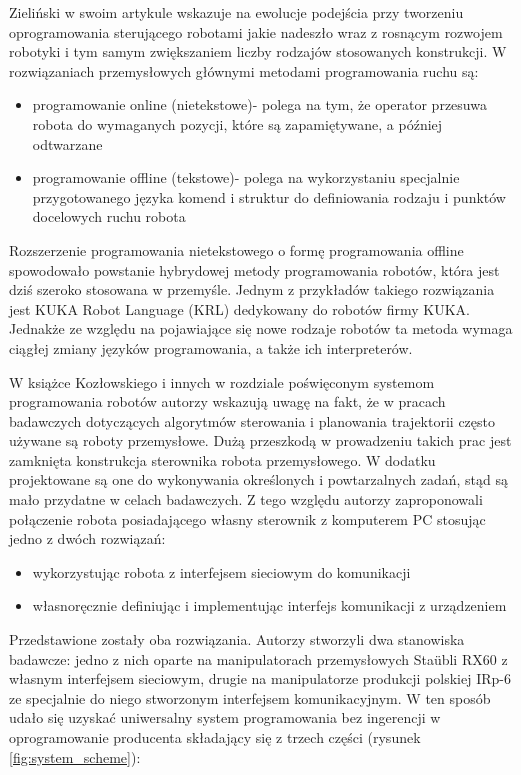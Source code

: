 \documentclass[a4paper, 12pt, twoside]{article}
\begin{document}
Zieliński w swoim artykule \cite{ramowezielinski} wskazuje na ewolucje podejścia przy tworzeniu oprogramowania sterującego robotami jakie nadeszło wraz z rosnącym rozwojem robotyki i tym samym zwiększaniem liczby rodzajów stosowanych konstrukcji. W rozwiązaniach przemysłowych głównymi metodami programowania ruchu są:

\begin{itemize}
\item programowanie online (nietekstowe)- polega na tym, że operator przesuwa robota do wymaganych pozycji, które są zapamiętywane, a później odtwarzane
\item programowanie offline (tekstowe)- polega na wykorzystaniu specjalnie przygotowanego języka komend i struktur do definiowania rodzaju i punktów docelowych ruchu robota
\end{itemize}

Rozszerzenie programowania nietekstowego o formę programowania offline spowodowało powstanie hybrydowej metody programowania robotów, która jest dziś szeroko stosowana w przemyśle. Jednym z przykładów takiego rozwiązania jest KUKA Robot Language (KRL)  dedykowany do robotów firmy KUKA. Jednakże ze względu na pojawiające się nowe rodzaje robotów ta metoda wymaga ciągłej zmiany języków programowania, a także ich interpreterów.

W książce Kozłowskiego i innych \cite{systemkozlowski} w rozdziale poświęconym systemom programowania robotów autorzy wskazują uwagę na fakt, że w pracach badawczych dotyczących algorytmów sterowania i planowania trajektorii często używane są roboty przemysłowe. Dużą przeszkodą w prowadzeniu takich prac jest zamknięta konstrukcja sterownika robota przemysłowego. W dodatku projektowane są one do wykonywania określonych i powtarzalnych zadań, stąd są mało przydatne w celach badawczych. Z tego względu autorzy zaproponowali połączenie robota posiadającego własny sterownik z komputerem PC stosując jedno z dwóch rozwiązań:

\begin{itemize}
\item wykorzystując robota z interfejsem sieciowym do komunikacji
\item własnoręcznie definiując i implementując interfejs komunikacji z urządzeniem
\end{itemize} 

Przedstawione zostały oba rozwiązania. Autorzy stworzyli dwa stanowiska badawcze: jedno z nich oparte na manipulatorach przemysłowych Sta{\"u}bli RX60 z własnym interfejsem sieciowym, drugie na manipulatorze produkcji polskiej IRp-6 ze specjalnie do niego stworzonym interfejsem komunikacyjnym. W ten sposób udało się uzyskać uniwersalny system programowania bez ingerencji w oprogramowanie producenta składający się z trzech części (rysunek \ref{fig:system_scheme}):
\end{document}
